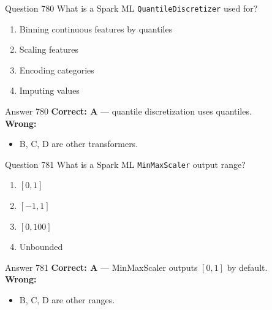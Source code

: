 \documentclass[aspectratio=169,11pt]{beamer}
\begin{document}
	\begin{frame}{Question 780}
		What is a Spark ML \texttt{QuantileDiscretizer} used for?
		\begin{enumerate}[label=\Alph*.]
			\item Binning continuous features by quantiles
			\item Scaling features
			\item Encoding categories
			\item Imputing values
		\end{enumerate}
	\end{frame}
	\begin{frame}{Answer 780}
		\textbf{Correct: A} --- quantile discretization uses quantiles.\\
		\vspace{0.5em}
		\textbf{Wrong:}
		\begin{itemize}
			\item B, C, D are other transformers.
		\end{itemize}
	\end{frame}
	
	\begin{frame}{Question 781}
		What is a Spark ML \texttt{MinMaxScaler} output range?
		\begin{enumerate}[label=\Alph*.]
			\item $[0,1]$
			\item $[-1,1]$
			\item $[0,100]$
			\item Unbounded
		\end{enumerate}
	\end{frame}
	\begin{frame}{Answer 781}
		\textbf{Correct: A} --- MinMaxScaler outputs $[0,1]$ by default.\\
		\vspace{0.5em}
		\textbf{Wrong:}
		\begin{itemize}
			\item B, C, D are other ranges.
		\end{itemize}
	\end{frame}
	
\end{document}
